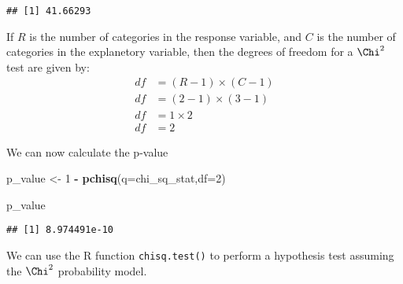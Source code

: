 \documentclass[]{article}
\newenvironment{Shaded}{\begin{snugshade}}{\end{snugshade}}
\newcommand{\DataTypeTok}[1]{\textcolor[rgb]{0.13,0.29,0.53}{#1}}
\newcommand{\DecValTok}[1]{\textcolor[rgb]{0.00,0.00,0.81}{#1}}
\newcommand{\KeywordTok}[1]{\textcolor[rgb]{0.13,0.29,0.53}{\textbf{#1}}}
\newcommand{\NormalTok}[1]{#1}
\newcommand{\OperatorTok}[1]{\textcolor[rgb]{0.81,0.36,0.00}{\textbf{#1}}}
\newcommand{\StringTok}[1]{\textcolor[rgb]{0.31,0.60,0.02}{#1}}
\begin{document}
\begin{verbatim}
## [1] 41.66293
\end{verbatim}

If \(R\) is the number of categories in the response variable, and \(C\)
is the number of categories in the explanetory variable, then the
degrees of freedom for a \(\Chi^{2}\) test are given by: \[
\begin{aligned}
df & = (R - 1) \times (C-1) \\
df & = (2 - 1) \times (3 -1) \\
df & = 1 \times 2 \\
df & = 2
\end{aligned}
\]

We can now calculate the p-value

\begin{Shaded}
\begin{Highlighting}[]
\NormalTok{p_value <-}\StringTok{ }\DecValTok{1} \OperatorTok{-}\StringTok{ }\KeywordTok{pchisq}\NormalTok{(}\DataTypeTok{q=}\NormalTok{chi_sq_stat,}\DataTypeTok{df=}\DecValTok{2}\NormalTok{)}

\NormalTok{p_value}
\end{Highlighting}
\end{Shaded}

\begin{verbatim}
## [1] 8.974491e-10
\end{verbatim}

We can use the R function \texttt{chisq.test()} to perform a hypothesis
test assuming the \(\Chi^{2}\) probability model.

\begin{Shaded}
\end{Shaded}
\end{document}
